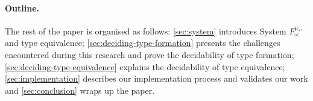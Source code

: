 \paragraph{Outline.}
The rest of the paper is organised as follows: \cref*{sec:system} introduces System $F^{\mu_*;}_\omega$ and type equivalence; \cref*{sec:deciding-type-formation} presents the challenges encountered during this research and prove the decidability of type formation; \cref*{sec:deciding-type-equivalence} explains the decidability of type equivalence; \cref*{sec:implementation} describes our implementation process and validates our work and \cref*{sec:conclusion} wraps up the paper.

